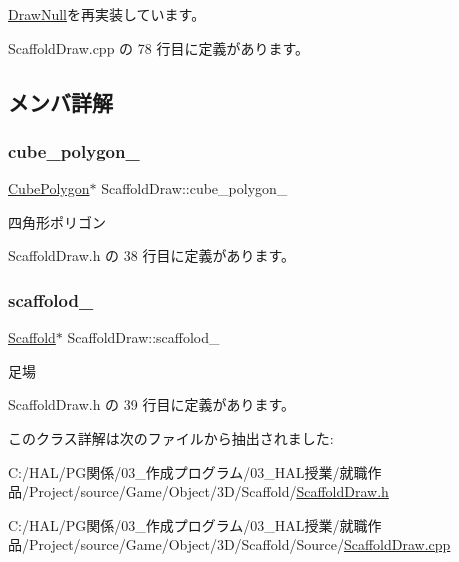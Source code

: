 \mbox{\hyperlink{class_draw_null_ad32a508d269de7eda8ad24ea72230464}{Draw\+Null}}を再実装しています。



 Scaffold\+Draw.\+cpp の 78 行目に定義があります。



\subsection{メンバ詳解}
\mbox{\label{class_scaffold_draw_a2296ab71298cdd4e8600c6c513e31390}} 
\subsubsection{\texorpdfstring{cube\+\_\+polygon\+\_\+}{cube\_polygon\_}}
{\footnotesize\ttfamily \mbox{\hyperlink{class_cube_polygon}{Cube\+Polygon}}$\ast$ Scaffold\+Draw\+::cube\+\_\+polygon\+\_\+\hspace{0.3cm}{\ttfamily [private]}}



四角形ポリゴン 



 Scaffold\+Draw.\+h の 38 行目に定義があります。

\mbox{\label{class_scaffold_draw_a3d77a9d774e193f9e5eede0c1f352006}} 
\subsubsection{\texorpdfstring{scaffolod\+\_\+}{scaffolod\_}}
{\footnotesize\ttfamily \mbox{\hyperlink{class_scaffold}{Scaffold}}$\ast$ Scaffold\+Draw\+::scaffolod\+\_\+\hspace{0.3cm}{\ttfamily [private]}}



足場 



 Scaffold\+Draw.\+h の 39 行目に定義があります。



このクラス詳解は次のファイルから抽出されました\+:\begin{DoxyCompactItemize}
\item 
C\+:/\+H\+A\+L/\+P\+G関係/03\+\_\+作成プログラム/03\+\_\+\+H\+A\+L授業/就職作品/\+Project/source/\+Game/\+Object/3\+D/\+Scaffold/\mbox{\hyperlink{_scaffold_draw_8h}{Scaffold\+Draw.\+h}}\item 
C\+:/\+H\+A\+L/\+P\+G関係/03\+\_\+作成プログラム/03\+\_\+\+H\+A\+L授業/就職作品/\+Project/source/\+Game/\+Object/3\+D/\+Scaffold/\+Source/\mbox{\hyperlink{_scaffold_draw_8cpp}{Scaffold\+Draw.\+cpp}}\end{DoxyCompactItemize}

